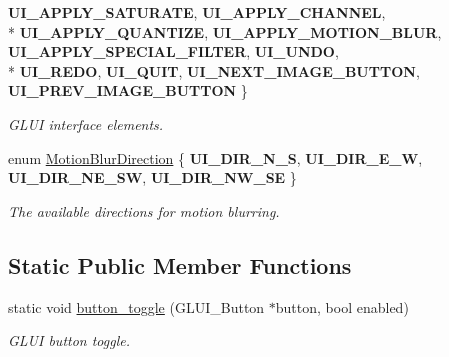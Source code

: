 \begin{DoxyCompactItemize}
{\bfseries U\+I\+\_\+\+A\+P\+P\+L\+Y\+\_\+\+S\+A\+T\+U\+R\+A\+TE}, 
{\bfseries U\+I\+\_\+\+A\+P\+P\+L\+Y\+\_\+\+C\+H\+A\+N\+N\+EL}, 
\\*
{\bfseries U\+I\+\_\+\+A\+P\+P\+L\+Y\+\_\+\+Q\+U\+A\+N\+T\+I\+ZE}, 
{\bfseries U\+I\+\_\+\+A\+P\+P\+L\+Y\+\_\+\+M\+O\+T\+I\+O\+N\+\_\+\+B\+L\+UR}, 
{\bfseries U\+I\+\_\+\+A\+P\+P\+L\+Y\+\_\+\+S\+P\+E\+C\+I\+A\+L\+\_\+\+F\+I\+L\+T\+ER}, 
{\bfseries U\+I\+\_\+\+U\+N\+DO}, 
\\*
{\bfseries U\+I\+\_\+\+R\+E\+DO}, 
{\bfseries U\+I\+\_\+\+Q\+U\+IT}, 
{\bfseries U\+I\+\_\+\+N\+E\+X\+T\+\_\+\+I\+M\+A\+G\+E\+\_\+\+B\+U\+T\+T\+ON}, 
{\bfseries U\+I\+\_\+\+P\+R\+E\+V\+\_\+\+I\+M\+A\+G\+E\+\_\+\+B\+U\+T\+T\+ON}
 \}\hypertarget{classimage__tools_1_1UICtrl_a94c1180d7f5541b2d52d0f56ff6dfbd6}{}\label{classimage__tools_1_1UICtrl_a94c1180d7f5541b2d52d0f56ff6dfbd6}
\begin{DoxyCompactList}\small\item\em G\+L\+UI interface elements. \end{DoxyCompactList}
\item 
enum \hyperlink{classimage__tools_1_1UICtrl_a56d4f68bf91302769d7bc453d8d57cee}{Motion\+Blur\+Direction} \{ {\bfseries U\+I\+\_\+\+D\+I\+R\+\_\+\+N\+\_\+S}, 
{\bfseries U\+I\+\_\+\+D\+I\+R\+\_\+\+E\+\_\+W}, 
{\bfseries U\+I\+\_\+\+D\+I\+R\+\_\+\+N\+E\+\_\+\+SW}, 
{\bfseries U\+I\+\_\+\+D\+I\+R\+\_\+\+N\+W\+\_\+\+SE}
 \}\hypertarget{classimage__tools_1_1UICtrl_a56d4f68bf91302769d7bc453d8d57cee}{}\label{classimage__tools_1_1UICtrl_a56d4f68bf91302769d7bc453d8d57cee}
\begin{DoxyCompactList}\small\item\em The available directions for motion blurring. \end{DoxyCompactList}
\end{DoxyCompactItemize}
\subsection*{Static Public Member Functions}
\begin{DoxyCompactItemize}
\item 
static void \hyperlink{classimage__tools_1_1UICtrl_ab69f0e1ea369485305d87820b61e1a50}{button\+\_\+toggle} (G\+L\+U\+I\+\_\+\+Button $\ast$button, bool enabled)\hypertarget{classimage__tools_1_1UICtrl_ab69f0e1ea369485305d87820b61e1a50}{}\label{classimage__tools_1_1UICtrl_ab69f0e1ea369485305d87820b61e1a50}

\begin{DoxyCompactList}\small\item\em G\+L\+UI button toggle. \end{DoxyCompactList}\end{DoxyCompactItemize}


